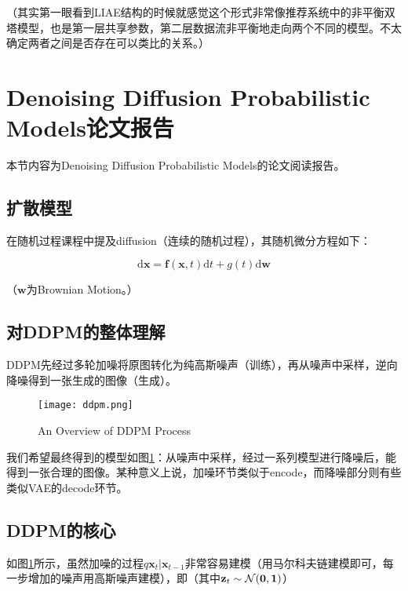 \documentclass[a4paper]{article}
\begin{document}
（其实第一眼看到LIAE结构的时候就感觉这个形式非常像推荐系统中的非平衡双塔模型，也是第一层共享参数，第二层数据流非平衡地走向两个不同的模型。不太确定两者之间是否存在可以类比的关系。）


\section{Denoising Diffusion Probabilistic Models论文报告}

本节内容为Denoising Diffusion Probabilistic Models\cite{ddpm}的论文阅读报告。

\subsection{扩散模型\cite{AI2613}}

在随机过程课程中提及diffusion（连续的随机过程），其随机微分方程如下：


\vspace{-1.5em}
$$\mathrm{d}\mathbf{x}=\mathbf{f}(\mathbf{x},t)\mathrm{d}t+g(t)\mathrm{d}\mathbf{w}$$


\vspace{-1em}
（$\mathbf{w}$为Brownian Motion。）

\subsection{对DDPM的整体理解}

DDPM先经过多轮加噪将原图转化为纯高斯噪声（训练），再从噪声中采样，逆向降噪得到一张生成的图像（生成）。

\begin{figure}[htb]
  \centering
  \texttt{[image: ddpm.png]}
  \caption{An Overview of DDPM Process \cite{ddpm}}
  \label{ddpm}
\end{figure}

我们希望最终得到的模型如图\ref{ddpm}：从噪声中采样，经过一系列模型进行降噪后，能得到一张合理的图像。某种意义上说，加噪环节类似于encode，而降噪部分则有些类似VAE的decode环节。

\subsection{DDPM的核心}

如图\ref{ddpm}所示，虽然加噪的过程$q{\mathbf{x}_t|\mathbf{x}_{t-1}}$非常容易建模（用马尔科夫链建模即可，每一步增加的噪声用高斯噪声建模），即（其中$\mathbf{z}_t\sim\mathcal{N}(\bf{0},\mathbf{1})$）
\end{document}
